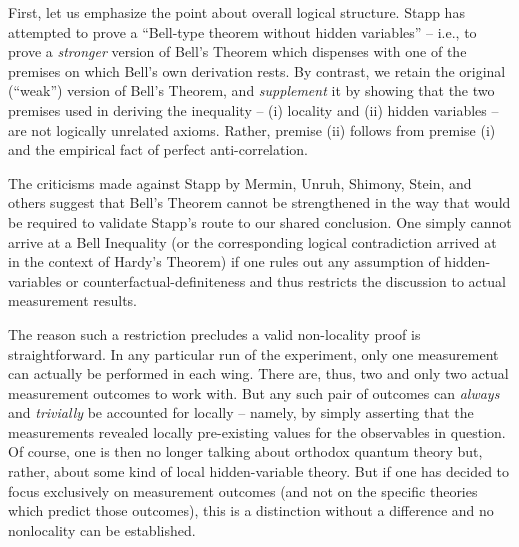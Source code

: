 \documentclass[aps,prc,onecolumn,12pt]{revtex4-2}
\begin{document}
First, let us emphasize the point about overall logical structure.
Stapp has attempted to prove a
``Bell-type theorem without hidden variables'' -- i.e., to prove a
\emph{stronger} version of Bell's Theorem which dispenses with one
of the premises on which Bell's own derivation rests.  By contrast,
we retain the original (``weak'') version of Bell's Theorem, and
\emph{supplement} it by showing that the two premises used in deriving the
inequality -- (i) locality and (ii) hidden variables -- are not
logically unrelated axioms.  Rather, premise (ii) follows from
premise (i) and the empirical fact of perfect anti-correlation.

The criticisms made against Stapp by Mermin, Unruh, Shimony, Stein,
and others suggest that Bell's Theorem cannot be
strengthened in the way that would be required to validate Stapp's
route to our shared conclusion.  One simply cannot arrive at a Bell
Inequality (or the corresponding logical contradiction arrived at in
the context of Hardy's Theorem) if one rules out any assumption of
hidden-variables or counterfactual-definiteness and thus
restricts the discussion to actual measurement results.

The reason such a restriction precludes a valid non-locality proof
is straightforward.  In any particular run
of the experiment, only one measurement can actually be performed in each
wing.  There are, thus, two and only two actual measurement outcomes
to work with.  But any such pair of outcomes can \emph{always}
and \emph{trivially} be accounted for locally -- namely, by simply
asserting that the measurements revealed locally pre-existing values
for the observables in question.  Of course, one is then no
longer talking about orthodox quantum theory but, rather, about some
kind of local hidden-variable theory.  But if one has decided to focus
exclusively on measurement outcomes (and not on the specific theories
which predict those outcomes), this is a distinction without a
difference and no nonlocality can be established.
\end{document}
